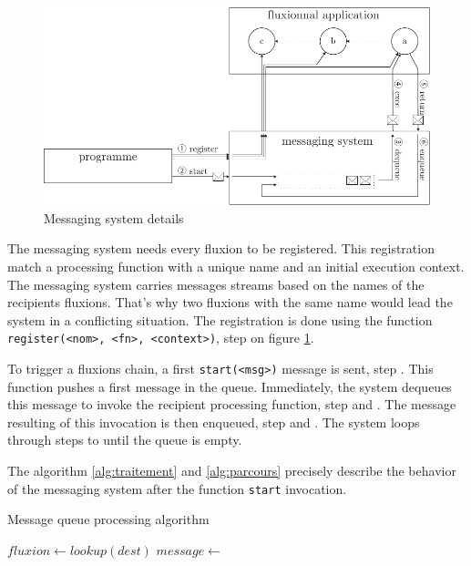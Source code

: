 \begin{figure}[h!]
  \includegraphics[width=\linewidth]{schema-message.pdf}
  \caption{Messaging system details}
  \label{fig:MesSys}
\end{figure}

The messaging system needs every fluxion to be registered.
This registration match a processing function with a unique name and an initial execution context.
The messaging system carries messages streams based on the names of the recipients fluxions.
That's why two fluxions with the same name would lead the system in a conflicting situation.
The registration is done using the function \texttt{register(<nom>, <fn>, <context>)}, step  on figure \ref{fig:MesSys}.

To trigger a fluxions chain, a first \texttt{start(<msg>)} message is sent, step .
This function pushes a first message in the queue.
Immediately, the system dequeues this message to invoke the recipient processing function, step  and .
The message resulting of this invocation is then enqueued, step  and .
The system loops through steps  to  until the queue is empty.

The algorithm \ref{alg:traitement} and \ref{alg:parcours} precisely describe the behavior of the messaging system after the function \texttt{start} invocation.

\begin{algorithm}
\caption{Message queue processing algorithm}
\label{alg:traitement}
\begin{algorithmic}
\State $fluxion \gets lookup(dest)$
\State $message \gets$  
\State {} 
\EndFor
\EndFunction
\end{algorithmic}
\end{algorithm}

